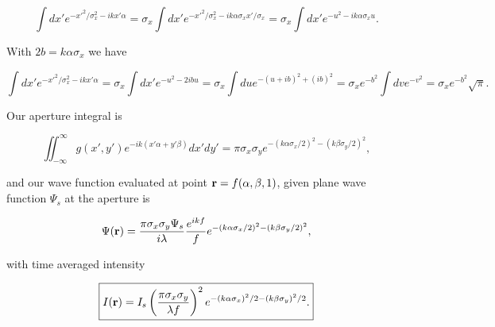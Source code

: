 {\begin{dmath}\label{eqn:modernOptics:ProblemSet2:P1:490}
\int dx' e^{-{x'}^2/\sigma_x^2 -i k x' \alpha}
=
\sigma_x \int dx' e^{-{x'}^2/\sigma_x^2 -i k \alpha \sigma_x x'/\sigma_x}
=
\sigma_x \int dx' e^{-u^2 -i k \alpha \sigma_x u}.
\end{dmath}

With $2 b = k \alpha \sigma_x$ we have

\begin{dmath}\label{eqn:modernOptics:ProblemSet2:P1:510}
\int dx' e^{-{x'}^2/\sigma_x^2 -i k x' \alpha}
=
\sigma_x \int dx' e^{-u^2 - 2 i b u}
=
\sigma_x \int du e^{ -(u + i b)^2 + (ib)^2 }
=
\sigma_x e^{-b^2} \int dv e^{ -v^2 }
=
\sigma_x e^{-b^2} \sqrt{\pi}.
\end{dmath}

Our aperture integral is

\begin{equation}\label{eqn:modernOptics:ProblemSet2:P1:530}
\iint_{-\infty}^\infty g(x', y') e^{-i k( x'\alpha + y' \beta) } dx' dy'
=
\pi \sigma_x \sigma_y
e^{
- (k \alpha \sigma_x/2)^2
- (k \beta \sigma_y/2)^2
},
\end{equation}

and our wave function evaluated at point $\mathbf{r} = f(\alpha, \beta, 1)$, given plane wave function $\Psi_s$ at the aperture is

\begin{equation}\label{eqn:modernOptics:ProblemSet2:P1:350b}
\Psi(\mathbf{r}) =
\frac{\pi \sigma_x \sigma_y \Psi_s}{i \lambda} \frac{e^{i k f}}{f}
e^{
- (k \alpha \sigma_x/2)^2
- (k \beta \sigma_y/2)^2
},
\end{equation}

with time averaged intensity

\begin{equation}\label{eqn:modernOptics:ProblemSet2:P1:550}
\boxed{
I(\mathbf{r}) = I_s
\left( \frac{\pi \sigma_x \sigma_y }{ \lambda f} \right)^2
e^{
- (k \alpha \sigma_x)^2/2
- (k \beta \sigma_y)^2/2
}.
}
\end{equation}

} %
